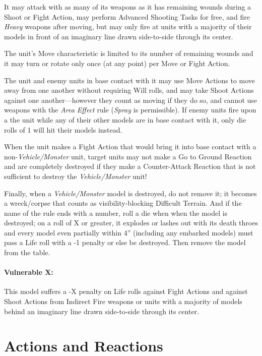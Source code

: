 \begin{multicols}{2}
It may attack with as many of its weapons as it has remaining wounds during a Shoot or Fight Action, may perform Advanced Shooting Tasks for free, and fire \textit{Heavy} weapons after moving, but may only fire at units with a majority of their models in front of an imaginary line drawn side-to-side through its center.

The unit's Move characteristic is limited to its number of remaining wounds and it may turn or rotate only once (at any point) per Move or Fight Action.

The unit and enemy units in base contact with it may use Move Actions to move away from one another without requiring Will rolls, and may take Shoot Actions against one another—however they count as moving if they do so, and cannot use weapons with the \textit{Area Effect} rule (\textit{Spray} is permissible). If enemy units fire upon a the unit while any of their other models are in base contact with it, only die rolls of 1 will hit their models instead.

When the unit makes a Fight Action that would bring it into base contact with a non-\textit{Vehicle/Monster} unit, target units may not make a Go to Ground Reaction and are completely destroyed if they make a Counter-Attack Reaction that is not sufficient to destroy the \textit{Vehicle/Monster} unit!

Finally, when a \textit{Vehicle/Monster} model is destroyed, do not remove it; it becomes a wreck/corpse that counts as visibility-blocking Difficult Terrain. And if the name of the rule ends with a number, roll a die when when the model is destroyed; on a roll of X or greater, it explodes or lashes out with its death throes and every model even partially within 4'' (including any embarked models) must pass a Life roll with a -1 penalty or else be destroyed. Then remove the model from the table.

\subsubsection*{Vulnerable X:} This model suffers a -X penalty on Life rolls against Fight Actions and against Shoot Actions from Indirect Fire weapons or units with a majority of models behind an imaginary line drawn side-to-side through its center.




\chapter{Actions and Reactions}


\end{multicols}
